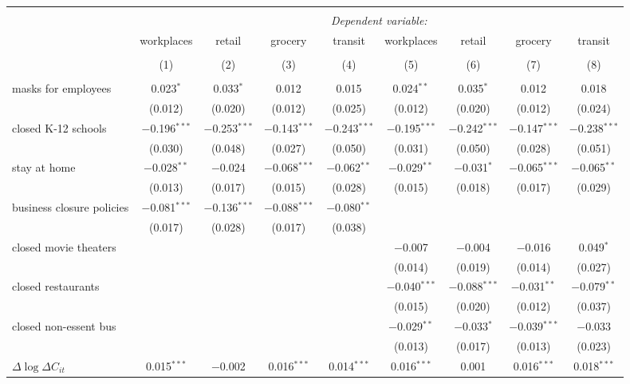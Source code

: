 \begin{tabular}{@{\extracolsep{1pt}}lcccccccc} 
\\[-1.8ex]\hline 
\hline \\[-1.8ex] 
 & \multicolumn{8}{c}{\textit{Dependent variable:}} \\ 
\cline{2-9} 
 & workplaces & retail & grocery & transit & workplaces & retail & grocery & transit \\ 
\\[-1.8ex] & (1) & (2) & (3) & (4) & (5) & (6) & (7) & (8)\\ 
\hline \\[-1.8ex] 
 masks for employees & 0.023$^{*}$ & 0.033$^{*}$ & 0.012 & 0.015 & 0.024$^{**}$ & 0.035$^{*}$ & 0.012 & 0.018 \\ 
  & (0.012) & (0.020) & (0.012) & (0.025) & (0.012) & (0.020) & (0.012) & (0.024) \\ 
  closed K-12 schools & $-$0.196$^{***}$ & $-$0.253$^{***}$ & $-$0.143$^{***}$ & $-$0.243$^{***}$ & $-$0.195$^{***}$ & $-$0.242$^{***}$ & $-$0.147$^{***}$ & $-$0.238$^{***}$ \\ 
  & (0.030) & (0.048) & (0.027) & (0.050) & (0.031) & (0.050) & (0.028) & (0.051) \\ 
  stay at home & $-$0.028$^{**}$ & $-$0.024 & $-$0.068$^{***}$ & $-$0.062$^{**}$ & $-$0.029$^{**}$ & $-$0.031$^{*}$ & $-$0.065$^{***}$ & $-$0.065$^{**}$ \\ 
  & (0.013) & (0.017) & (0.015) & (0.028) & (0.015) & (0.018) & (0.017) & (0.029) \\ 
  business closure policies & $-$0.081$^{***}$ & $-$0.136$^{***}$ & $-$0.088$^{***}$ & $-$0.080$^{**}$ &  &  &  &  \\ 
  & (0.017) & (0.028) & (0.017) & (0.038) &  &  &  &  \\ 
  closed movie theaters &  &  &  &  & $-$0.007 & $-$0.004 & $-$0.016 & 0.049$^{*}$ \\ 
  &  &  &  &  & (0.014) & (0.019) & (0.014) & (0.027) \\ 
  closed restaurants &  &  &  &  & $-$0.040$^{***}$ & $-$0.088$^{***}$ & $-$0.031$^{**}$ & $-$0.079$^{**}$ \\ 
  &  &  &  &  & (0.015) & (0.020) & (0.012) & (0.037) \\ 
  closed non-essent bus &  &  &  &  & $-$0.029$^{**}$ & $-$0.033$^{*}$ & $-$0.039$^{***}$ & $-$0.033 \\ 
  &  &  &  &  & (0.013) & (0.017) & (0.013) & (0.023) \\ 
  $\Delta \log \Delta C_{it}$ & 0.015$^{***}$ & $-$0.002 & 0.016$^{***}$ & 0.014$^{***}$ & 0.016$^{***}$ & 0.001 & 0.016$^{***}$ & 0.018$^{***}$ \\ 

\end{tabular}
